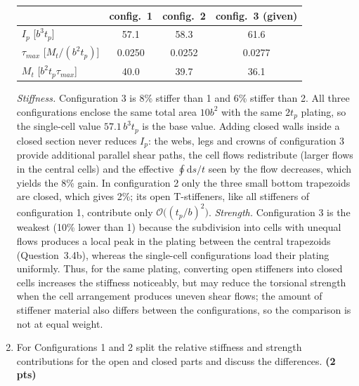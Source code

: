 \begin{enumerate}[label=\alph*.]
  \begin{center}\small
  \begin{tabular}{lccc}
    \toprule
     & config.\ 1 & config.\ 2 & config.\ 3 (given) \\
    \midrule
    $I_p$ [$b^3t_p$] & 57.1 & 58.3 & 61.6 \\
    $\tau_{max}$ [$M_t/(b^2t_p)$] & 0.0250 & 0.0252 & 0.0277 \\
    $M_t$ [$b^2t_p\tau_{max}$] & 40.0 & 39.7 & 36.1 \\
    \bottomrule
  \end{tabular}
  \end{center}
  \emph{Stiffness.} Configuration 3 is 8\% stiffer than 1 and 6\% stiffer than 2. All three configurations enclose the same total area $10b^2$ with the same $2t_p$ plating, so the single-cell value $57.1\,b^3t_p$ is the base value. Adding closed walls inside a closed section never reduces $I_p$: the webs, legs and crowns of configuration 3 provide additional parallel shear paths, the cell flows redistribute (larger flows in the central cells) and the effective $\oint\mathrm{d}s/t$ seen by the flow decreases, which yields the 8\% gain. In configuration 2 only the three small bottom trapezoids are closed, which gives 2\%; its open T-stiffeners, like all stiffeners of configuration 1, contribute only $\mathcal O\big((t_p/b)^2\big)$. \emph{Strength.} Configuration 3 is the weakest (10\% lower than 1) because the subdivision into cells with unequal flows produces a local peak in the plating between the central trapezoids (Question~3.4b), whereas the single-cell configurations load their plating uniformly. Thus, for the same plating, converting open stiffeners into closed cells increases the stiffness noticeably, but may reduce the torsional strength when the cell arrangement produces uneven shear flows; the amount of stiffener material also differs between the configurations, so the comparison is not at equal weight.

  \item For Configurations 1 and 2 split the relative stiffness and strength contributions for the open and closed parts and discuss the differences. \textbf{(2 pts)}


\end{enumerate}

